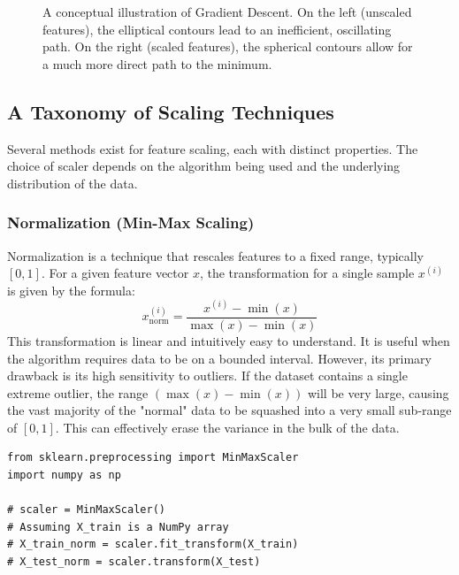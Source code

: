 \begin{itemize}
\begin{figure}[h!]
    \centering
    \caption{A conceptual illustration of Gradient Descent. On the left (unscaled features), the elliptical contours lead to an inefficient, oscillating path. On the right (scaled features), the spherical contours allow for a much more direct path to the minimum.}
    \label{fig:gradient_descent_scaling}
\end{figure}

\subsection{A Taxonomy of Scaling Techniques}
\label{subsec:scaling_taxonomy}
Several methods exist for feature scaling, each with distinct properties. The choice of scaler depends on the algorithm being used and the underlying distribution of the data.

\subsubsection{Normalization (Min-Max Scaling)}
Normalization is a technique that rescales features to a fixed range, typically $[0, 1]$. For a given feature vector $x$, the transformation for a single sample $x^{(i)}$ is given by the formula:
$$ x_{\text{norm}}^{(i)} = \frac{x^{(i)} - \min(x)}{\max(x) - \min(x)} $$
This transformation is linear and intuitively easy to understand. It is useful when the algorithm requires data to be on a bounded interval. However, its primary drawback is its high sensitivity to outliers. If the dataset contains a single extreme outlier, the range $(\max(x) - \min(x))$ will be very large, causing the vast majority of the "normal" data to be squashed into a very small sub-range of $[0, 1]$. This can effectively erase the variance in the bulk of the data.

\begin{verbatim}
from sklearn.preprocessing import MinMaxScaler
import numpy as np

# scaler = MinMaxScaler()
# Assuming X_train is a NumPy array
# X_train_norm = scaler.fit_transform(X_train)
# X_test_norm = scaler.transform(X_test)
\end{verbatim}


\end{itemize}
